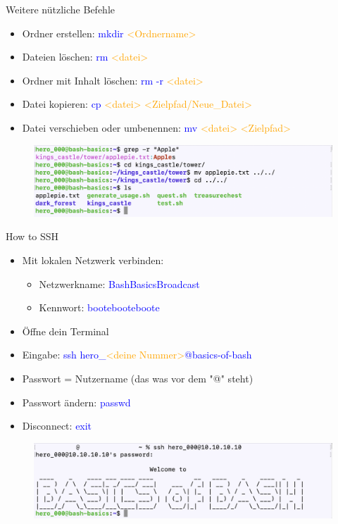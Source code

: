 \documentclass[t, xcolor=dvipsnames]{beamer}
\begin{document}
\begin{frame}{Weitere nützliche Befehle}
    \begin{itemize}
        \item Ordner erstellen: \textcolor{blue}{mkdir} \textcolor{orange}{<Ordnername>}
        \item Dateien löschen: \textcolor{blue}{rm} \textcolor{orange}{<datei>}
        \item Ordner mit Inhalt löschen: \textcolor{blue}{rm -r} \textcolor{orange}{<datei>}
        \item Datei kopieren: \textcolor{blue}{cp} \textcolor{orange}{<datei> <Zielpfad/Neue\_Datei>}
        \item Datei verschieben oder umbenennen: \textcolor{blue}{mv} \textcolor{orange}{<datei> <Zielpfad>}
    \end{itemize}
    
    \begin{figure}
    	\centering
    	\includegraphics[width=1\textwidth]{graphics/mv}
    \end{figure}
\end{frame}


\begin{frame}{How to SSH}
    \begin{itemize}
        \item Mit lokalen Netzwerk verbinden:
        \begin{itemize}
            \item Netzwerkname: \textcolor{blue}{BashBasicsBroadcast}
            \item Kennwort: \textcolor{blue}{bootebooteboote}
        \end{itemize}
        \item Öffne dein Terminal
        \item Eingabe: \textcolor{blue}{ssh hero\_}\textcolor{orange}{<deine Nummer>}\textcolor{blue}{@basics-of-bash}
        \item Passwort = Nutzername (das was vor dem "@" steht)
        \item Passwort ändern: \textcolor{blue}{passwd}
        \item Disconnect: \textcolor{blue}{exit}
    \end{itemize}
    \begin{figure}
        \centering
        \includegraphics[width=1\textwidth]{graphics/ssh}
    \end{figure}
\end{frame}
\end{document}
